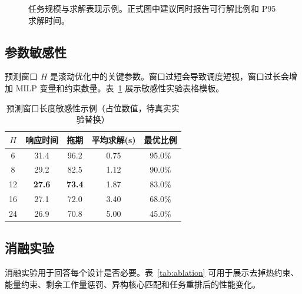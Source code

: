 \documentclass[conference]{IEEEtran}
\begin{document}
\begin{figure}[t]
\centering
{}
\caption{任务规模与求解表现示例。正式图中建议同时报告可行解比例和 P95 求解时间。}
\label{fig:scale-solver}
\end{figure}

\subsection{参数敏感性}

预测窗口 $H$ 是滚动优化中的关键参数。窗口过短会导致调度短视，窗口过长会增加 MILP 变量和约束数量。表~\ref{tab:h-sensitivity} 展示敏感性实验表格模板。

\begin{table}[t]
\centering
\caption{预测窗口长度敏感性示例（占位数值，待真实实验替换）}
\label{tab:h-sensitivity}
\begin{tabular}{ccccc}
\toprule
$H$ & 响应时间 & 拖期 & 平均求解(s) & 最优比例 \\
\midrule
6 & 31.4 & 96.2 & 0.75 & 95.0\% \\
8 & 29.2 & 82.5 & 1.12 & 90.0\% \\
12 & \textbf{27.6} & \textbf{73.4} & 1.87 & 83.0\% \\
16 & 27.1 & 72.0 & 3.40 & 68.0\% \\
24 & 26.9 & 70.8 & 5.00 & 45.0\% \\
\bottomrule
\end{tabular}
\end{table}

\subsection{消融实验}

消融实验用于回答每个设计是否必要。表~\ref{tab:ablation} 可用于展示去掉热约束、能量约束、剩余工作量惩罚、异构核心匹配和任务重排后的性能变化。
\end{document}
